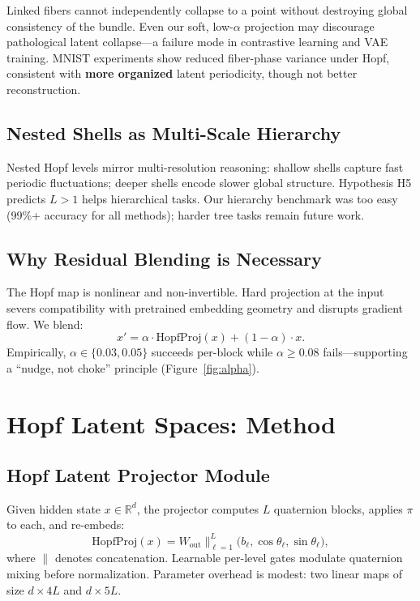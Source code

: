 \documentclass[11pt,twocolumn]{article}
\begin{document}
Linked fibers cannot independently collapse to a point without destroying global consistency of the bundle. Even our soft, low-$\alpha$ projection may discourage pathological latent collapse---a failure mode in contrastive learning and VAE training. MNIST experiments show reduced fiber-phase variance under Hopf, consistent with \textbf{more organized} latent periodicity, though not better reconstruction.

\subsection{Nested Shells as Multi-Scale Hierarchy}

Nested Hopf levels mirror multi-resolution reasoning: shallow shells capture fast periodic fluctuations; deeper shells encode slower global structure. Hypothesis H5 predicts $L>1$ helps hierarchical tasks. Our hierarchy benchmark was too easy (99\%+ accuracy for all methods); harder tree tasks remain future work.

\subsection{Why Residual Blending is Necessary}

The Hopf map is nonlinear and non-invertible. Hard projection at the input severs compatibility with pretrained embedding geometry and disrupts gradient flow. We blend:
\begin{equation}
\label{eq:blend}
x' = \alpha \cdot \mathrm{HopfProj}(x) + (1-\alpha)\cdot x.
\end{equation}
Empirically, $\alpha\in\{0.03,0.05\}$ succeeds per-block while $\alpha\ge 0.08$ fails---supporting a ``nudge, not choke'' principle (Figure~\ref{fig:alpha}).

\section{Hopf Latent Spaces: Method}
\label{sec:method}

\subsection{Hopf Latent Projector Module}

Given hidden state $x\in\mathbb{R}^d$, the projector computes $L$ quaternion blocks, applies $\pi$ to each, and re-embeds:
\begin{equation}
\mathrm{HopfProj}(x) = W_{\mathrm{out}} \Big\|_{\ell=1}^{L} \big(b_\ell, \cos\theta_\ell, \sin\theta_\ell\big),
\end{equation}
where $\|$ denotes concatenation. Learnable per-level gates modulate quaternion mixing before normalization. Parameter overhead is modest: two linear maps of size $d\times 4L$ and $d\times 5L$.
\end{document}
